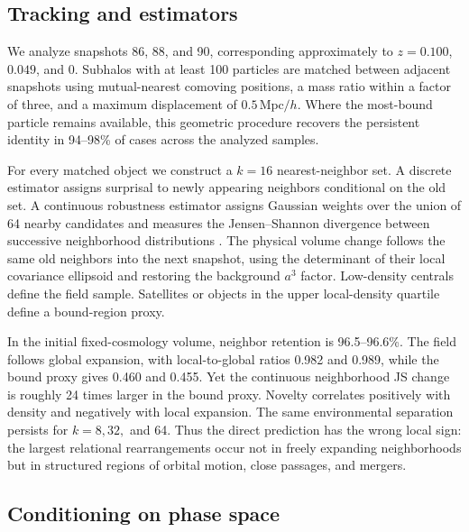 \documentclass[10pt,twocolumn]{article}
\begin{document}
\subsection{Tracking and estimators}

We analyze snapshots 86, 88, and 90, corresponding approximately to
$z=0.100$, $0.049$, and 0.  Subhalos with at least 100 particles are matched
between adjacent snapshots using mutual-nearest comoving positions, a mass
ratio within a factor of three, and a maximum displacement of
$0.5\,\mathrm{Mpc}/h$.  Where the most-bound particle remains available, this
geometric procedure recovers the persistent identity in 94--98\% of cases
across the analyzed samples.

For every matched object we construct a $k=16$ nearest-neighbor set.  A discrete
estimator assigns surprisal to newly appearing neighbors conditional on the old
set.  A continuous robustness estimator assigns Gaussian weights over the
union of 64 nearby candidates and measures the Jensen--Shannon divergence
between successive neighborhood distributions \citep{Lin1991}.  The physical
volume change follows the same old neighbors into the next snapshot, using the
determinant of their local covariance ellipsoid and restoring the background
$a^3$ factor.  Low-density centrals define the field sample.  Satellites or
objects in the upper local-density quartile define a bound-region proxy.

In the initial fixed-cosmology volume, neighbor retention is 96.5--96.6\%.
The field follows global expansion, with local-to-global ratios 0.982 and
0.989, while the bound proxy gives 0.460 and 0.455.  Yet the continuous
neighborhood JS change is roughly 24 times larger in the bound proxy.  Novelty
correlates positively with density and negatively with local expansion.  The
same environmental separation persists for $k=8,32,$ and 64.  Thus the direct
prediction has the wrong local sign: the largest relational rearrangements
occur not in freely expanding neighborhoods but in structured regions of
orbital motion, close passages, and mergers.

\subsection{Conditioning on phase space}
\end{document}
